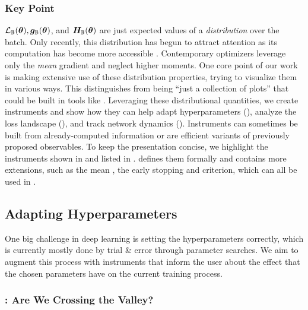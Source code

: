\subsubsection{Key Point}

${\mathcal{L}}_{{\mathbb{B}}}({\bm{\theta}}), {\bm{g}}_{{\mathbb{B}}}({\bm{\theta}})$, and ${\bm{H}}_{{\mathbb{B}}}({\bm{\theta}})$ are just
expected values of a \textit{distribution} over the batch. Only recently, this
distribution has begun to attract attention \citep{faghri2020study} as its
computation has become more accessible \citep{bradbury2018jax,
  dangel2020backpack}. Contemporary optimizers leverage only the \emph{mean}
gradient and neglect higher moments. One core point of our work is making
extensive use of these distribution properties, trying to visualize them in
various ways. This distinguishes \cockpit from being ``just a collection of
plots'' that could be built in tools like \tensorboard. Leveraging these
distributional quantities, we create instruments and show how they can help
adapt hyperparameters (), analyze
the loss landscape (), and track network dynamics
(). Instruments can sometimes be built from
already-computed information or are efficient variants of previously proposed
observables. To keep the presentation concise, we highlight the instruments
shown in  and listed in
.  defines
them formally and contains more extensions, such as the mean \gsnr
\citep{liu2020understanding}, the early stopping \citep{mahsereci2017early} and
\cabs \citep{balles2017coupling} criterion, which can all be used in \cockpit.



\subsection{Adapting Hyperparameters}\label{cockpit::sec:adapting_hyperparameters}
One big challenge in deep learning is setting the hyperparameters correctly,
which is currently mostly done by trial \& error through parameter searches. We
aim to augment this process with instruments that inform the user about the
effect that the chosen parameters have on the current training process.

\subsubsection{: Are We Crossing the Valley?}

